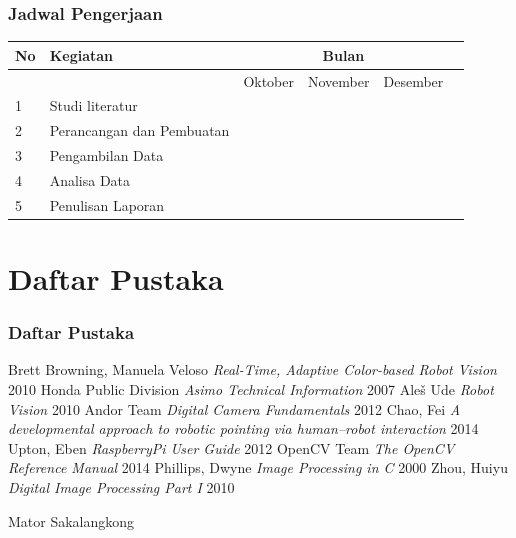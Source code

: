 \documentclass[table,dvipsnames]{beamer}
\begin{document}
\begin{frame}
\frametitle{Jadwal Pengerjaan}
\begin{table}
 \begin{tabular}{ |l|l|l|l|l|l| }
   \hline
   No & Kegiatan & \multicolumn{3}{|c|}{Bulan} \\
   \hline
     &  & Oktober & November & Desember \\
   \hline
   1 & Studi literatur & \cellcolor{blue} & \cellcolor{blue} & \\
   \hline
   2 & Perancangan dan Pembuatan & \cellcolor{blue} & \cellcolor{blue} & \\
   \hline
   3 & Pengambilan Data & & \cellcolor{blue} & \cellcolor{blue} \\
   \hline
   4 & Analisa Data & & & \cellcolor{blue} \\
   \hline
   5 & Penulisan Laporan & & \cellcolor{blue} & \cellcolor{blue} \\
  \hline
\end{tabular}
\end{table}
\end{frame}

\section{Daftar Pustaka}

\begin{frame}
\frametitle{Daftar Pustaka}
\footnotesize{
\begin{thebibliography}{99} %
 Brett Browning, Manuela Veloso \textit{Real-Time, Adaptive Color-based Robot Vision} 2010
 Honda Public Division \textit{Asimo Technical Information} 2007
 Aleš Ude \textit{Robot Vision} 2010
 Andor Team \textit{Digital Camera Fundamentals} 2012
 Chao, Fei \textit{A developmental approach to robotic pointing via human–robot interaction} 2014
 Upton, Eben \textit{RaspberryPi User Guide} 2012
 OpenCV Team \textit{The OpenCV Reference Manual} 2014
 Phillips, Dwyne \textit{Image Processing in C} 2000
 Zhou, Huiyu \textit{Digital Image Processing Part I} 2010
\end{thebibliography}
}
\end{frame}


\begin{frame}
\Huge{\centerline{Mator Sakalangkong}}
\end{frame}
\end{document}
